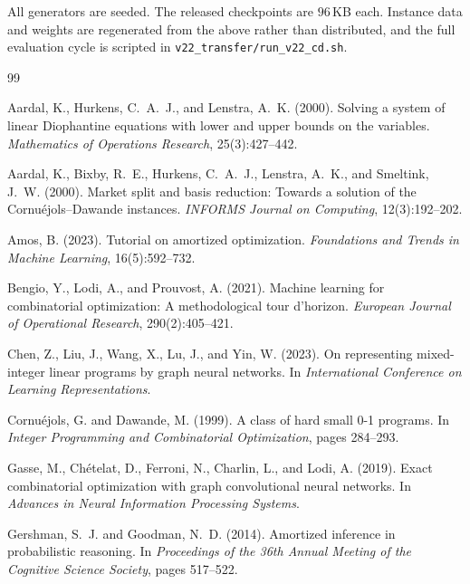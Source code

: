 \documentclass[11pt]{article}
\begin{document}
All generators are seeded. The released checkpoints are $96$\,KB each. Instance data and weights are regenerated from the above rather than distributed, and the full evaluation cycle is scripted in \texttt{v22\_transfer/run\_v22\_cd.sh}.

\begin{thebibliography}{99}

Aardal, K., Hurkens, C.~A.~J., and Lenstra, A.~K. (2000).
Solving a system of linear Diophantine equations with lower and upper bounds on the variables.
\emph{Mathematics of Operations Research}, 25(3):427--442.

Aardal, K., Bixby, R.~E., Hurkens, C.~A.~J., Lenstra, A.~K., and Smeltink, J.~W. (2000).
Market split and basis reduction: Towards a solution of the Cornu\'ejols--Dawande instances.
\emph{INFORMS Journal on Computing}, 12(3):192--202.

Amos, B. (2023).
Tutorial on amortized optimization.
\emph{Foundations and Trends in Machine Learning}, 16(5):592--732.

Bengio, Y., Lodi, A., and Prouvost, A. (2021).
Machine learning for combinatorial optimization: A methodological tour d'horizon.
\emph{European Journal of Operational Research}, 290(2):405--421.

Chen, Z., Liu, J., Wang, X., Lu, J., and Yin, W. (2023).
On representing mixed-integer linear programs by graph neural networks.
In \emph{International Conference on Learning Representations}.

Cornu\'ejols, G. and Dawande, M. (1999).
A class of hard small 0-1 programs.
In \emph{Integer Programming and Combinatorial Optimization}, pages 284--293.

Gasse, M., Ch\'etelat, D., Ferroni, N., Charlin, L., and Lodi, A. (2019).
Exact combinatorial optimization with graph convolutional neural networks.
In \emph{Advances in Neural Information Processing Systems}.

Gershman, S.~J. and Goodman, N.~D. (2014).
Amortized inference in probabilistic reasoning.
In \emph{Proceedings of the 36th Annual Meeting of the Cognitive Science Society}, pages 517--522.


\end{thebibliography}
\end{document}
